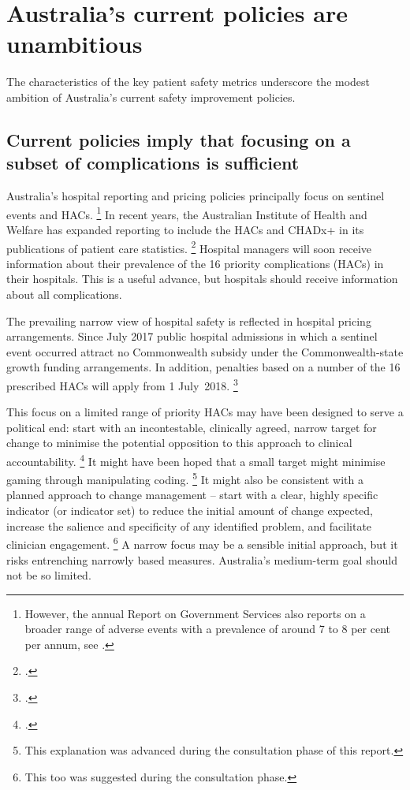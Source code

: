 \documentclass[FrontPage]{grattan}
\begin{document}
\section{ Australia's current policies are unambitious}\label{sec:australias-current-policies-are-unambitious}

The characteristics of the key patient safety metrics underscore the modest ambition of Australia's current safety improvement policies.

\subsection{Current policies imply that focusing on a subset of complications is sufficient}\label{subsec:current-policies-imply-that-focusing-on-a-subset-of-complications-is-sufficient}

Australia's hospital reporting and pricing policies principally focus on sentinel events and HACs.%
	\footnote{However, the annual Report on Government Services also reports on a broader range of adverse events with a prevalence of around 7 to 8 per cent per annum, see \textcite[][Table~12A.35]{PC-2017-Report-on-Govt-services--Public-hospitals}.}
In recent years, the Australian Institute of Health and Welfare has expanded reporting to include the HACs and CHADx+ in its publications of patient care statistics.%
	\footcite{AIHW-2017-Admitted-patient-care-2015-16-Aust-hosp-stats}
Hospital managers will soon receive information about their prevalence of the 16 priority complications (HACs) in their hospitals.
This is a useful advance, but hospitals should receive information about all complications.

The prevailing narrow view of hospital safety is reflected in hospital pricing arrangements.
Since July 2017 public hospital admissions in which a sentinel event occurred attract no Commonwealth subsidy under the Commonwealth-state growth funding arrangements.
In addition, penalties based on a number of the 16 prescribed HACs will apply from 1 July~2018.%
	\footcite{Duckett-2017-theConvo-Cutting-funding-unlikely-to-change-patient-care}

This focus on a limited range of priority HACs may have been designed to serve a political end: start with an incontestable, clinically agreed, narrow target for change to minimise the potential opposition to this approach to clinical accountability.%
	\footcite{Mehlman-2013-Professional-power-and-standard-of-care-in-medicine}
It might have been hoped that a small target might minimise gaming through manipulating coding.%
	\footnote{This explanation was advanced during the consultation phase of this report.}
It might also be consistent with a planned approach to change management -- start with a clear, highly specific indicator (or indicator set) to reduce the initial amount of change expected, increase the salience and specificity of any identified problem, and facilitate clinician engagement.%
	\footnote{This too was suggested during the consultation phase.}
A narrow focus may be a sensible initial approach, but it risks entrenching narrowly based measures.
Australia's medium-term goal should not be so limited.
\end{document}
